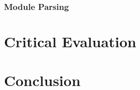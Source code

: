 \documentclass[
author=Kiran Sturt,
degree=BSc,
title=Implementing a Step by Step Evaluator for a Simple Functional Programming language,
unit=COMS30045,twoside]{dissertation}
\theoremstyle{definition}
\theoremstyle{break}
\theoremstyle{definition}
\begin{document}
\subsection{Module Parsing}

\chapter{Critical Evaluation}
\label{chap:evaluation}


\chapter{Conclusion}
\label{chap:conclusion}


%
%
%

\backmatter




\end{document}
